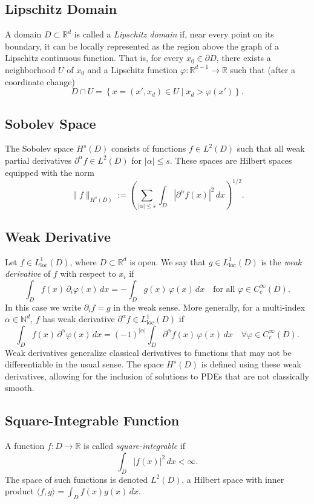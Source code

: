 \documentclass[11pt]{article}
\theoremstyle{plain}
\theoremstyle{definition}
\theoremstyle{remark}
\begin{document}
\subsection{Lipschitz Domain}
\label{def:lipschitz}
A domain $D \subset \mathbb{R}^d$ is called a \emph{Lipschitz domain} if, near
every point on its boundary, it can be locally represented as the region above
the graph of a Lipschitz continuous function. That is, for every
$x_0 \in \partial D$, there exists a neighborhood $U$ of $x_0$ and a Lipschitz
function $\varphi: \mathbb{R}^{d-1} \to \mathbb{R}$ such that (after a
coordinate change)
\[
D \cap U = \left\{ x = (x', x_d) \in U \mid x_d > \varphi(x') \right\}.
\]

\subsection{Sobolev Space}
\label{def:sobolev}
The Sobolev space $H^s(D)$ consists of functions $f \in L^2(D)$ such that all
weak partial derivatives $\partial^\alpha f \in L^2(D)$ for $|\alpha| \leq s$.
These spaces are Hilbert spaces equipped with the norm
\[
\|f\|_{H^s(D)} := \left( \sum_{|\alpha| \leq s} \int_D
|\partial^\alpha f(x)|^2 \, dx \right)^{1/2}.
\]

\subsection{Weak Derivative}
\label{def:weak}
Let $f \in L^1_{\text{loc}}(D)$, where $D \subset \mathbb{R}^d$ is open. We say
that $g \in L^1_{\text{loc}}(D)$ is the \emph{weak derivative} of $f$ with
respect to $x_i$ if
\[
\int_D f(x) \, \partial_i \varphi(x) \, dx = - \int_D g(x) \, \varphi(x) \, dx
\quad \text{for all } \varphi \in C_c^\infty(D).
\]
In this case we write $\partial_i f = g$ in the weak sense. More generally,
for a multi-index $\alpha \in \mathbb{N}^d$, $f$ has weak derivative
$\partial^\alpha f \in L^1_{\text{loc}}(D)$ if
\[
\int_D f(x) \, \partial^\alpha \varphi(x) \, dx = (-1)^{|\alpha|}
\int_D \partial^\alpha f(x) \, \varphi(x) \, dx
\quad \forall \varphi \in C_c^\infty(D).
\]
Weak derivatives generalize classical derivatives to functions that may not be
differentiable in the usual sense. The space $H^s(D)$ is defined using these
weak derivatives, allowing for the inclusion of solutions to PDEs that are not
classically smooth.

\subsection{Square-Integrable Function}
\label{def:l2}
A function $f: D \to \mathbb{R}$ is called \emph{square-integrable} if
\[
\int_D |f(x)|^2 \, dx < \infty.
\]
The space of such functions is denoted $L^2(D)$, a Hilbert space with inner
product $\langle f, g \rangle = \int_D f(x)g(x) \, dx$.
\end{document}
